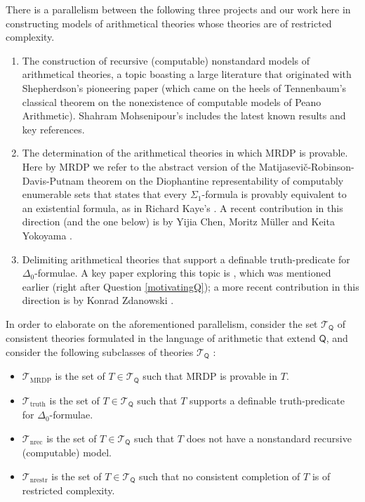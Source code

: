 \documentclass{amsart}
\newcommand{\T}{{\mathcal T}}
\begin{document}
There is a parallelism between the following three projects and our work here in constructing models of arithmetical theories whose theories are of restricted complexity.
\begin{enumerate}[$1$.]
    \item The construction of recursive (computable) nonstandard models of arithmetical theories, a topic boasting a large literature that originated with Shepherdson's pioneering paper \cite {shep:nons64} (which came on the heels of Tennenbaum's classical theorem on the nonexistence of computable models of Peano Arithmetic). Shahram Mohsenipour's \cite{MohseniIOpen} includes the latest known results and key references. 
    \item The determination of the arithmetical theories in which MRDP is provable. Here by MRDP we refer to the abstract version of the Matijasevi\v c-Robinson-Davis-Putnam theorem on the Diophantine representability of computably enumerable sets that states that every $\Sigma_1$-formula is provably equivalent to an existential formula, as in Richard Kaye's \cite{Kaye_Tennenbaum}. A recent contribution in this direction (and the one below) is by Yijia Chen, Moritz M{\"uller} and Keita Yokoyama \cite{Chen_Muller_Yokoyama}.
    \item Delimiting arithmetical theories that support a definable truth-predicate for $\Delta_0$-formulae. A key paper exploring this topic is \cite {adam:truth12}, which was mentioned earlier (right after Question \ref{motivatingQ}); a more recent contribution in this direction is by Konrad Zdanowski \cite{Zdanowski-Delta_0-truth}.
    \end{enumerate}
    In order to elaborate on the aforementioned parallelism, consider the set $\mathcal{T}_{\mathsf{Q}}$ of consistent theories formulated in the 
    language of arithmetic that extend $\mathsf{Q}$, and consider the following subclasses of theories $\mathcal{T}_{\mathsf{Q}}$ : 
\begin{itemize}
\item $\T_{\mathrm{MRDP}}$ is the set of $T\in \mathcal{T}_{\mathsf{Q}}$ such that MRDP is provable in $T$.
\item $\T_{\mathrm{truth}}$ is the set of $T\in \mathcal{T}_{\mathsf{Q}}$ such that $T$ supports a definable truth-predicate for $\Delta_0$-formulae.
\item $\T_{\mathrm{nrec}}$ is the set of $T\in \mathcal{T}_{\mathsf{Q}}$ such that $T$ does not have a nonstandard recursive (computable) model. 
\item $\T_{\mathrm{nrestr}}$ is the set of $T\in \mathcal{T}_{\mathsf{Q}}$ such that no consistent completion of $T$ is of restricted complexity.
\end{itemize}
\end{document}
